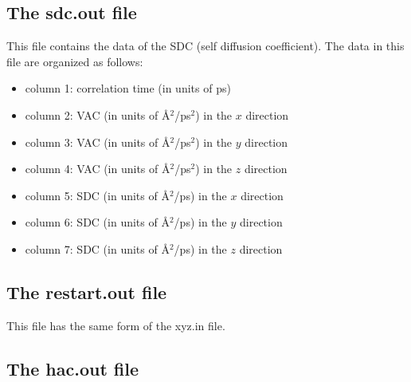 \documentclass[12pt,a4paper]{report}
\begin{document}
\subsection{The sdc.out file}
This file contains the data of the SDC (self diffusion coefficient). The data in this file are organized as follows:
\begin{itemize}
\item column 1: correlation time (in units of ps)
\item column 2: VAC (in units of \AA$^2$/ps$^2$) in the $x$ direction
\item column 3: VAC (in units of \AA$^2$/ps$^2$) in the $y$ direction
\item column 4: VAC (in units of \AA$^2$/ps$^2$) in the $z$ direction
\item column 5: SDC (in units of \AA$^2$/ps) in the $x$ direction
\item column 6: SDC (in units of \AA$^2$/ps) in the $y$ direction
\item column 7: SDC (in units of \AA$^2$/ps) in the $z$ direction
\end{itemize}



\subsection{The restart.out file}

This file has the same form of the xyz.in file.

\subsection{The hac.out file}
\end{document}
